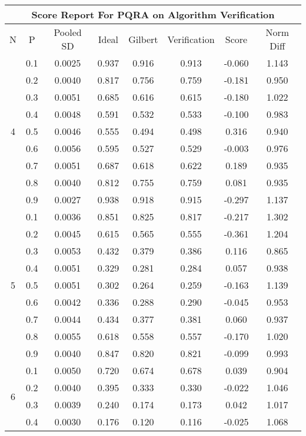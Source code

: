\documentclass[11pt,a4paper]{report}
\begin{document}
\begin{longtable}{ | c | c || c | c | c | c | c | c | }
\hline
\multicolumn{8}{|c|}{ Score Report For PQRA on Algorithm Verification} \\
\hline
N & P & Pooled SD &  Ideal &  Gilbert & Verification  & Score & Norm Diff \\
 \hline
 \hline
 \endhead
\multirow{9}{*}{4} & 0.1 & 0.0025 & 0.937 & 0.916 & 0.913 & -0.060 & 1.143 \\
 & 0.2 & 0.0040 & 0.817 & 0.756 & 0.759 & -0.181 & 0.950 \\
 & 0.3 & 0.0051 & 0.685 & 0.616 & 0.615 & -0.180 & 1.022 \\
 & 0.4 & 0.0048 & 0.591 & 0.532 & 0.533 & -0.100 & 0.983 \\
 & 0.5 & 0.0046 & 0.555 & 0.494 & 0.498 & 0.316 & 0.940 \\
 & 0.6 & 0.0056 & 0.595 & 0.527 & 0.529 & -0.003 & 0.976 \\
 & 0.7 & 0.0051 & 0.687 & 0.618 & 0.622 & 0.189 & 0.935 \\
 & 0.8 & 0.0040 & 0.812 & 0.755 & 0.759 & 0.081 & 0.935 \\
 & 0.9 & 0.0027 & 0.938 & 0.918 & 0.915 & -0.297 & 1.137 \\
 \hline
\multirow{9}{*}{5} & 0.1 & 0.0036 & 0.851 & 0.825 & 0.817 & -0.217 & 1.302 \\
 & 0.2 & 0.0045 & 0.615 & 0.565 & 0.555 & -0.361 & 1.204 \\
 & 0.3 & 0.0053 & 0.432 & 0.379 & 0.386 & 0.116 & 0.865 \\
 & 0.4 & 0.0051 & 0.329 & 0.281 & 0.284 & 0.057 & 0.938 \\
 & 0.5 & 0.0051 & 0.302 & 0.264 & 0.259 & -0.163 & 1.139 \\
 & 0.6 & 0.0042 & 0.336 & 0.288 & 0.290 & -0.045 & 0.953 \\
 & 0.7 & 0.0044 & 0.434 & 0.377 & 0.381 & 0.060 & 0.937 \\
 & 0.8 & 0.0055 & 0.618 & 0.558 & 0.557 & -0.170 & 1.020 \\
 & 0.9 & 0.0040 & 0.847 & 0.820 & 0.821 & -0.099 & 0.993 \\
 \hline
\multirow{9}{*}{6} & 0.1 & 0.0050 & 0.720 & 0.674 & 0.678 & 0.039 & 0.904 \\
 & 0.2 & 0.0040 & 0.395 & 0.333 & 0.330 & -0.022 & 1.046 \\
 & 0.3 & 0.0039 & 0.240 & 0.174 & 0.173 & 0.042 & 1.017 \\
 & 0.4 & 0.0030 & 0.176 & 0.120 & 0.116 & -0.025 & 1.068 \\

\end{longtable}
\end{document}
